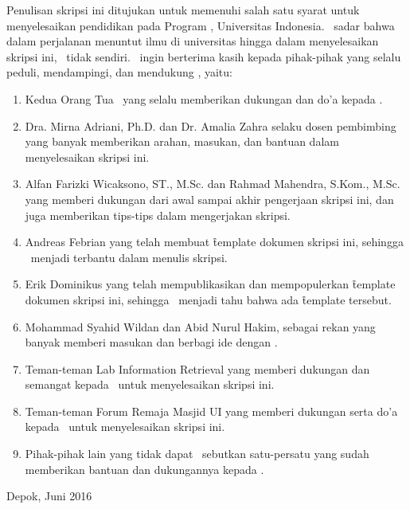 Penulisan skripsi ini ditujukan untuk memenuhi salah satu syarat untuk menyelesaikan pendidikan pada Program \gelar, Universitas Indonesia. \Saya~sadar bahwa dalam perjalanan menuntut ilmu di universitas hingga dalam menyelesaikan skripsi ini, \saya~tidak sendiri. \Saya~ingin berterima kasih kepada pihak-pihak yang selalu peduli, mendampingi, dan mendukung \saya, yaitu:

\begin{enumerate}
	\item Kedua Orang Tua \saya~yang selalu memberikan dukungan dan do'a kepada \saya.
	\item Dra. Mirna Adriani, Ph.D. dan Dr. Amalia Zahra selaku dosen pembimbing yang banyak memberikan arahan, masukan, dan bantuan dalam menyelesaikan skripsi ini.
  \item Alfan Farizki Wicaksono, ST., M.Sc. dan Rahmad Mahendra, S.Kom., M.Sc. yang memberi dukungan dari awal sampai akhir pengerjaan skripsi ini, dan juga memberikan tips-tips dalam mengerjakan skripsi.
  \item Andreas Febrian yang telah membuat \f{template} dokumen skripsi ini, sehingga \saya~menjadi terbantu dalam menulis skripsi.
  \item Erik Dominikus yang telah mempublikasikan dan mempopulerkan \f{template} dokumen skripsi ini, sehingga \saya~menjadi tahu bahwa ada \f{template} tersebut.
	\item Mohammad Syahid Wildan dan Abid Nurul Hakim, sebagai rekan yang banyak memberi masukan dan berbagi ide dengan \saya.
  \item Teman-teman Lab Information Retrieval yang memberi dukungan dan semangat kepada \saya~untuk menyelesaikan skripsi ini.
  \item Teman-teman Forum Remaja Masjid UI yang memberi dukungan serta do'a kepada \saya~untuk menyelesaikan skripsi ini.
	\item Pihak-pihak lain yang tidak dapat \saya~sebutkan satu-persatu yang sudah memberikan bantuan dan dukungannya kepada \saya.
\end{enumerate}
\vspace*{0.1cm}
\begin{flushright}
Depok, Juni 2016\\[0.1cm]
\vspace*{1cm}
\penulis

\end{flushright}%
%
%
%

